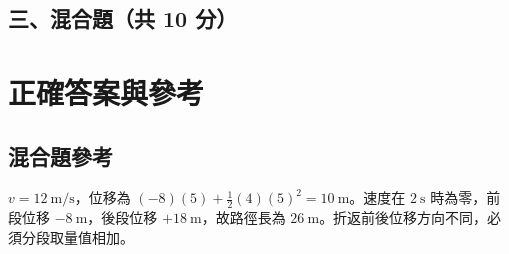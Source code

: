 \documentclass[10pt,a4paper]{article}
\begin{document}
\subsection*{三、混合題（共 10 分）}
\newpage\section*{正確答案與參考}\begin{center}\end{center}
\subsection*{混合題參考}$v=12\ \mathrm{m/s}$，位移為 $(-8)(5)+\frac12(4)(5)^2=10\ \mathrm{m}$。速度在 $2\ \mathrm{s}$ 時為零，前段位移 $-8\ \mathrm{m}$，後段位移 $+18\ \mathrm{m}$，故路徑長為 $26\ \mathrm{m}$。折返前後位移方向不同，必須分段取量值相加。
\end{document}
